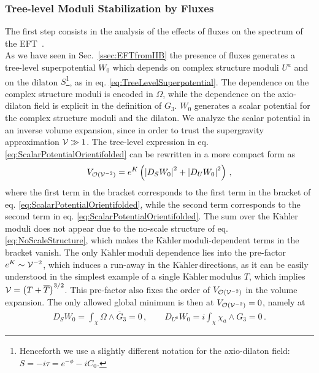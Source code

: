 \documentclass[12pt,a4paper]{book}
\newcommand{\Kahler}{\ensuremath{\text{K}\ddot{\text{a}}\text{hler}\,}}
\newcommand{\V}{{\cal{V}}}
\begin{document}
\subsubsection{Tree-level Moduli Stabilization by Fluxes}
\label{sssec:TreeLevelModuliStabilization}

The first step consists in the analysis of the effects of fluxes on the spectrum of the EFT~\cite{Giddings:2001yu, Kachru:2003aw, Lust:2005bd, Antoniadis:2005nu, Gomis:2005wc, GarciadelMoral:2005js, Camara:2004jj}.\\

As we have seen in Sec.~\ref{ssec:EFTfromIIB} the presence of fluxes generates a tree-level superpotential $W_0$ which depends on complex structure moduli $U^a$ and on the dilaton $S$\footnote{Henceforth we use a slightly different notation for the axio-dilaton field: $S = -i \tau = e^{- \phi} - i C_0$.}, as in eq. \eqref{eq:TreeLevelSuperpotential}. The dependence on the complex structure moduli is encoded in $\Omega$, while the dependence on the axio-dilaton field is explicit in the definition of $G_3$. $W_0$ generates a scalar potential for the complex structure moduli and the dilaton. We analyze the scalar potential in an inverse volume expansion, since in order to trust the supergravity approximation $\V \gg 1$. The tree-level expression in eq. \eqref{eq:ScalarPotentialOrientifolded} can be rewritten in a more compact form as
\begin{align}
\label{eq:ScalarPotentialNoScale}
V_{\mathcal{O}\left(\V^{-2}\right)} = e^{K} \left(\left|D_S W_0\right|^2 + \left|D_{U} W_0\right|^2\right)\,,
\end{align}
where the first term in the bracket corresponds to the first term in the bracket of eq. \eqref{eq:ScalarPotentialOrientifolded}, while the second term corresponds to the second term in eq. \eqref{eq:ScalarPotentialOrientifolded}. The sum over the \Kahler moduli does not appear due to the no-scale structure of eq. \eqref{eq:NoScaleStructure}, which makes the \Kahler moduli-dependent terms in the bracket vanish. The only \Kahler moduli dependence lies into the pre-factor $e^K \sim \V^{-2}$, which induces a run-away in the \Kahler directions, as it can be easily understood in the simplest example of a single \Kahler modulus $T$, which implies $\V = \left(T + \overline{T}\right)^{3/2}$. This pre-factor also fixes the order of $V_{\mathcal{O}\left(\V^{-2}\right)}$ in the volume expansion. The only allowed global minimum is then at $V_{\mathcal{O}\left(\V^{-2}\right)} = 0$, namely at
\begin{align}
\label{eq:GlobalMinimum}
D_S W_0 = \int_\chi \Omega \wedge \overline{G}_3 = 0\,, \qquad D_{U^a} W_0 = i \int_{\chi} \chi_a \wedge G_3 = 0\,.
\end{align}
\end{document}
